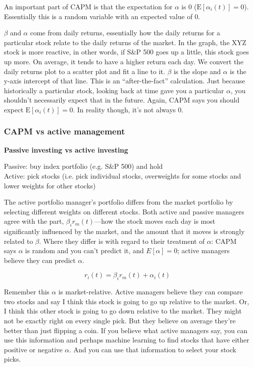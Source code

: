 \documentclass[12pt]{article}
\newcommand{\q}[1]{``#1''}
\begin{document}
An important part of CAPM is that the expectation for $\alpha$ is 0 ($\text{E}[\alpha_i(t)]=0$). Essentially this is a random variable with an expected value of 0. 

$\beta$ and $\alpha$ come from daily returns, essentially how the daily returns for a particular stock relate to the daily returns of the market. In the graph, the XYZ stock is more reactive, in other words, if S\&P 500 goes up a little, this stock goes up more. On average, it tends to have a higher return each day. We convert the daily returns plot to a scatter plot and fit a line to it. $\beta$ is the slope and $\alpha$ is the y-axis intercept of that line. This is an \q{after-the-fact} calculation. Just because historically a particular stock, looking back at time gave you a particular $\alpha$, you shouldn't necessarily expect that in the future. Again, CAPM says you should expect $\text{E}[\alpha_i(t)]=0$. In reality though, it's not always 0. 

\subsubsection{CAPM vs active management}

\textbf{Passive investing vs active investing} 

\noindent
Passive: buy index portfolio (e.g. S\&P 500) and hold \\
Active: pick stocks (i.e. pick individual stocks, overweights for some stocks and lower weights for other stocks)

The active portfolio manager's portfolio differs from the market portfolio by selecting different weights on different stocks. Both active and passive managers agree with the part, $\beta_ir_m(t)$---how the stock moves each day is most significantly influenced by the market, and the amount that it moves is strongly related to $\beta$. Where they differ is with regard to their treatment of $\alpha$: CAPM says $\alpha$ is random and you can't predict it, and $E[\alpha]=0$; active managers believe they can predict $\alpha$. 

\begin{equation}
r_i(t) = \beta_ir_m(t) + \alpha_i(t)
\end{equation}

Remember this $\alpha$ is market-relative. Active managers believe they can compare two stocks and say I think this stock is going to go up relative to the market. Or, I think this other stock is going to go down relative to the market. They might not be exactly right on every single pick. But they believe on average they're better than just flipping a coin. If you believe what active managers say, you can use this information and perhaps machine learning to find stocks that have either positive or negative $\alpha$. And you can use that information to select your stock picks. 
\end{document}
